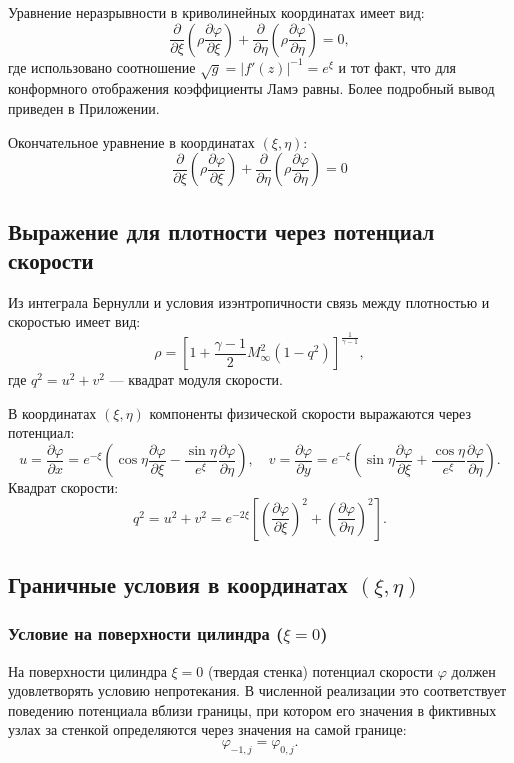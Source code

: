 \documentclass[a4paper,12pt]{article}
\begin{document}
	Уравнение неразрывности в криволинейных координатах имеет вид:
	\[
	\frac{\partial}{\partial \xi} \left( \rho \frac{\partial \varphi}{\partial \xi} \right) + \frac{\partial}{\partial \eta} \left( \rho \frac{\partial \varphi}{\partial \eta} \right) = 0,
	\]
	где использовано соотношение $\sqrt{g} = |f'(z)|^{-1} = e^{\xi}$ и тот факт, что для конформного отображения коэффициенты Ламэ равны. Более подробный вывод приведен в Приложении.
	
	Окончательное уравнение в координатах $(\xi, \eta)$:
	\begin{equation}
		\boxed{\frac{\partial}{\partial \xi} \left( \rho \frac{\partial \varphi}{\partial \xi} \right) + \frac{\partial}{\partial \eta} \left( \rho \frac{\partial \varphi}{\partial \eta} \right) = 0}
	\end{equation}
	
	\subsection{Выражение для плотности через потенциал скорости}
	Из интеграла Бернулли и условия изэнтропичности связь между плотностью и скоростью имеет вид:
	\[
	\rho = \left[ 1 + \frac{\gamma-1}{2} M_\infty^2 \left( 1 - q^2 \right) \right]^{\frac{1}{\gamma-1}},
	\]
	где $q^2 = u^2 + v^2$ — квадрат модуля скорости.
	
	В координатах $(\xi, \eta)$ компоненты физической скорости выражаются через потенциал:
	\[
	u = \frac{\partial \varphi}{\partial x} = e^{-\xi} \left( \cos\eta \frac{\partial \varphi}{\partial \xi} - \frac{\sin\eta}{e^{\xi}} \frac{\partial \varphi}{\partial \eta} \right), \quad
	v = \frac{\partial \varphi}{\partial y} = e^{-\xi} \left( \sin\eta \frac{\partial \varphi}{\partial \xi} + \frac{\cos\eta}{e^{\xi}} \frac{\partial \varphi}{\partial \eta} \right).
	\]
	Квадрат скорости:
	\[
	q^2 = u^2 + v^2 = e^{-2\xi} \left[ \left( \frac{\partial \varphi}{\partial \xi} \right)^2 + \left( \frac{\partial \varphi}{\partial \eta} \right)^2 \right].
	\]
	
	\subsection{Граничные условия в координатах $(\xi, \eta)$}
	
	\subsubsection{Условие на поверхности цилиндра ($\xi = 0$)}
	На поверхности цилиндра $\xi = 0$ (твердая стенка) потенциал скорости $\varphi$ должен удовлетворять условию непротекания. В численной реализации это соответствует поведению потенциала вблизи границы, при котором его значения в фиктивных узлах за стенкой определяются через значения на самой границе:
	\[
	\varphi_{-1,j} = \varphi_{0,j}.
	\]
	
\end{document}
